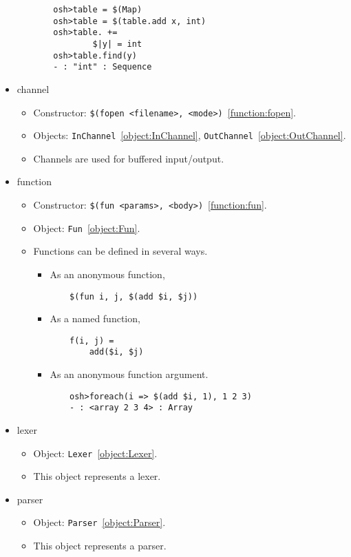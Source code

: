 \begin{itemize}
\begin{itemize}
\begin{verbatim}
    osh>table = $(Map)
    osh>table = $(table.add x, int)
    osh>table. +=
            $|y| = int
    osh>table.find(y)
    - : "int" : Sequence
\end{verbatim}
\end{itemize}

\item channel

\begin{itemize}
\item Constructor: \verb+$(fopen <filename>, <mode>)+~\ref{function:fopen}.
\item Objects: \verb+InChannel+~\ref{object:InChannel}, \verb+OutChannel+~\ref{object:OutChannel}.
\item Channels are used for buffered input/output.
\end{itemize}

\item function

\begin{itemize}
\item Constructor: \verb+$(fun <params>, <body>)+~\ref{function:fun}.
\item Object: \verb+Fun+~\ref{object:Fun}.
\item Functions can be defined in several ways.
\begin{itemize}
\item As an anonymous function,
\begin{verbatim}
    $(fun i, j, $(add $i, $j))
\end{verbatim}
\item As a named function,
\begin{verbatim}
    f(i, j) =
        add($i, $j)
\end{verbatim}
\item
\newinkeyword
As an anonymous function argument.
\begin{verbatim}
    osh>foreach(i => $(add $i, 1), 1 2 3)
    - : <array 2 3 4> : Array
\end{verbatim}
\end{itemize}
\end{itemize}

\item lexer

\begin{itemize}
\item Object: \verb+Lexer+~\ref{object:Lexer}.
\item This object represents a lexer.
\end{itemize}

\item parser

\begin{itemize}
\item Object: \verb+Parser+~\ref{object:Parser}.
\item This object represents a parser.
\end{itemize}
\end{itemize}

